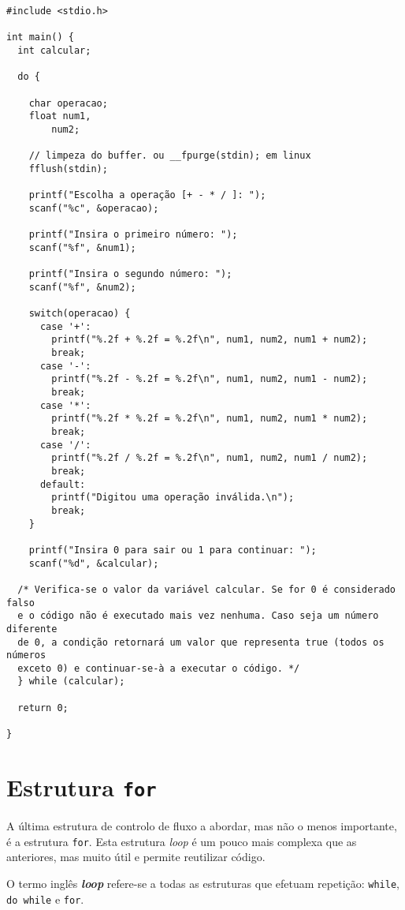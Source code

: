 \begin{lstlisting}
#include <stdio.h>
 
int main() {
  int calcular;
 
  do {
 
    char operacao;
    float num1,
        num2;
 
    // limpeza do buffer. ou __fpurge(stdin); em linux
    fflush(stdin);    
 
    printf("Escolha a operação [+ - * / ]: ");
    scanf("%c", &operacao);
 
    printf("Insira o primeiro número: ");
    scanf("%f", &num1);
 
    printf("Insira o segundo número: ");
    scanf("%f", &num2);
 
    switch(operacao) {
      case '+':
        printf("%.2f + %.2f = %.2f\n", num1, num2, num1 + num2);
        break;
      case '-':
        printf("%.2f - %.2f = %.2f\n", num1, num2, num1 - num2);
        break;
      case '*':
        printf("%.2f * %.2f = %.2f\n", num1, num2, num1 * num2);
        break;
      case '/':
        printf("%.2f / %.2f = %.2f\n", num1, num2, num1 / num2);
        break;
      default:
        printf("Digitou uma operação inválida.\n");
        break;
    }
 
    printf("Insira 0 para sair ou 1 para continuar: ");
    scanf("%d", &calcular);
 
  /* Verifica-se o valor da variável calcular. Se for 0 é considerado falso
  e o código não é executado mais vez nenhuma. Caso seja um número diferente
  de 0, a condição retornará um valor que representa true (todos os números
  exceto 0) e continuar-se-à a executar o código. */
  } while (calcular);
 
  return 0;
 
}
\end{lstlisting}

\section{Estrutura \texttt{for}}

A última estrutura de controlo de fluxo a abordar, mas não o menos importante, é a estrutura \texttt{for}. Esta estrutura \textit{loop} é um pouco mais complexa que as anteriores, mas muito útil e permite reutilizar código.

\begin{defi}
O termo inglês \textit{\textbf{loop}} refere-se a todas as estruturas que efetuam repetição: \texttt{while}, \texttt{do while} e \texttt{for}.
\end{defi}

